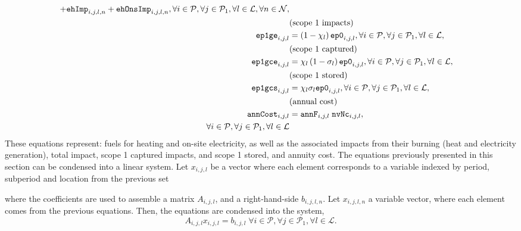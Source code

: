 \documentclass{amsbook}
\begin{document}
\begin{align}
    + \mathtt{ehImp}_{i,j,l,n} + \mathtt{ehOnsImp}_{i,j,l,n}, 
    \forall i \in \mathcal{P},
    \forall j \in \mathcal{P}_1, 
    \forall l \in \mathcal{L},
    \forall n \in \mathcal{N}, \\
    & \text{(scope 1 impacts)} \notag \\
    \mathtt{ep1ge}_{i,j,l} &= \left(1-\chi_{l}\right) \mathtt{ep0}_{i,j,l}, 
    \forall i \in \mathcal{P},
    \forall j \in \mathcal{P}_1, 
    \forall l \in \mathcal{L}, \\
    & \text{(scope 1 captured)} \notag \\
    \mathtt{ep1gce}_{i,j,l} &= 
    \chi_{l} \left(1-\sigma_{l}\right) \mathtt{ep0}_{i,j,l}, 
    \forall i \in \mathcal{P},
    \forall j \in \mathcal{P}_1, 
    \forall l \in \mathcal{L}, \\
    & \text{(scope 1 stored)} \notag \\
    \mathtt{ep1gcs}_{i,j,l} &= 
    \chi_{l} \sigma_{l} \mathtt{ep0}_{i,j,l}, 
    \forall i \in \mathcal{P},
    \forall j \in \mathcal{P}_1, 
    \forall l \in \mathcal{L}, \\
    & \text{(annual cost)} \notag \\
    \mathtt{annCost}_{i,j,l} &= 
    \mathtt{annF}_{i,j,l}\; \mathtt{nvNc}_{i,j,l}, \\
    \forall i \in \mathcal{P},
    \forall j \in \mathcal{P}_1 , 
    \forall l \in \mathcal{L}
\end{align}
%
These equations represent: fuels for heating and on-site electricity, as well as
the associated impacts from their burning (heat and electricity generation),
total impact, scope 1 captured impacts, and scope 1 stored, and annuity cost.
%
The equations previously presented in this section can be condensed into a
linear system. Let $x_{i,j,l}$ be a vector where each element corresponds to
a variable indexed by period, subperiod and location from the previous set

where the coefficients are used to assemble a matrix $A_{i,j,l}$,
and a right-hand-side $b_{i,j,l,n}$. Let $x_{i,j,l,n}$  a variable vector, where
each element comes from the previous equations. Then, the equations are
condensed into the system,
%
\begin{equation}\label{eq:base_sys}
    A_{i,j,l} x_{i,j,l} = b_{i,j,l} \; \forall i \in \mathcal{P}, \forall j \in \mathcal{P}_1, \forall l \in \mathcal{L}.
\end{equation}
%
\end{document}
